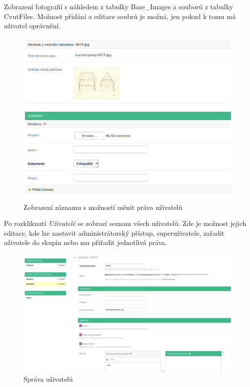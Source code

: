 Zobrazení fotografií s náhledem z tabulky Base\_Images a souborů z tabulky CvutFiles. Možnost přidání a editace soubrů je možná, jen pokud k tomu má uživatel oprávnění.

\begin{figure}[H] \centering
  \includegraphics[width=320pt]{./pictures/54-obrazky.png}
    \caption[Zobrazení záznamu s možností měnit práva uživatelů]{Zobrazení záznamu s možností měnit práva uživatelů}
	\label{Zobrazení záznamu s možností měnit práva uživatelů}                                
\end{figure}


Po rozkliknutí \emph{Uživatelé} se zobrazí seznam všech uživatelů. Zde je možnost jejich editace, kde lze nastavit administrátorský přístup, superuživatele, zařadit uživatele do skupin nebo mu přiřadit jednotlivá práva.

\begin{figure}[H] \centering
  \includegraphics[width=390pt]{./pictures/55-sprava-uzivatelu.png}
    \caption[Správa uživatelů]{Správa uživatelů}
	\label{Správa uživatelů}                                
\end{figure}


